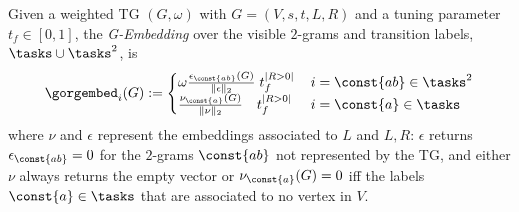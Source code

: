 \begin{definition}[G-Embedding]\label{def:ppne}
	Given a weighted TG $(G,\omega)$ with $G=(V,s,t,L,R)$ and a tuning parameter $t_f\in[0,1]$, the \emph{G-Embedding} 
	over the visible $2$-grams and transition labels, $\tasks\cup\tasks^2$, is 
	$$\gorgembed_{i}(G):=\begin{cases}
	\omega \frac{\epsilon_\const{ab}(G)}{\|\epsilon\|_2}\;t_f^{|R>0|}\, & {i}=\const{ab}\in\tasks^2\\
	\frac{\nu_\const{a}(G)}{\|\nu\|_2}\;\;\;\,t_f^{|R>0|}\, & {i}=\const{a}\in\tasks\\
	\end{cases}$$
	where $\nu$ and $\epsilon$ represent the embeddings associated to $L$ and $L,R$: $\epsilon$  returns 
	$\epsilon_\const{ab}=0$ for the $2$-grams $\const{ab}$ not represented by the TG, and either $\nu$ always returns the empty 
	vector or $\nu_\const{a}(G)=0$ iff the labels $\const{a}\in\tasks$ that are associated to no vertex in $V$.
\end{definition}
